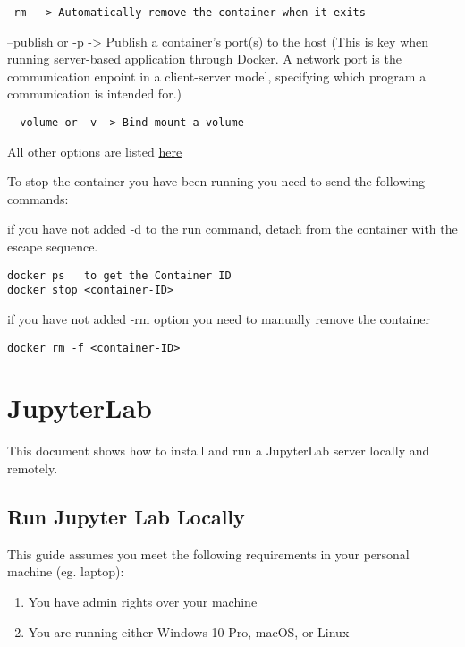 \documentclass[
]{book}
\providecommand{\tightlist}{%
  \setlength{\itemsep}{0pt}\setlength{\parskip}{0pt}}
\begin{document}
\begin{verbatim}
-rm  -> Automatically remove the container when it exits
\end{verbatim}

--publish or -p -\textgreater{} Publish a container's port(s) to the host (This is key when running server-based application through Docker. A network port is the communication enpoint in a client-server model, specifying which program a communication is intended for.)

\begin{verbatim}
--volume or -v -> Bind mount a volume 
\end{verbatim}

All other options are listed \href{https://docs.docker.com/engine/reference/commandline/run/}{here}

To stop the container you have been running you need to send the following commands:

if you have not added -d to the run command, detach from the container with the escape sequence.

\begin{verbatim}
docker ps   to get the Container ID
docker stop <container-ID>  
\end{verbatim}

if you have not added -rm option you need to manually remove the container

\begin{verbatim}
docker rm -f <container-ID>
\end{verbatim}

\hypertarget{jupyterlab}{%
\chapter{JupyterLab}\label{jupyterlab}}

This document shows how to install and run a JupyterLab server locally and
remotely.

\hypertarget{run-jupyter-lab-locally}{%
\section{Run Jupyter Lab Locally}\label{run-jupyter-lab-locally}}

This guide assumes you meet the following requirements in your personal
machine (eg. laptop):

\begin{enumerate}
\def\labelenumi{\arabic{enumi}.}
\tightlist
\item
  You have admin rights over your machine
\item
  You are running either Windows 10 Pro, macOS, or Linux
\end{enumerate}
\end{document}

